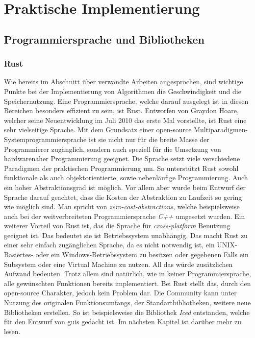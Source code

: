 \section{Praktische Implementierung}

\subsection{Programmiersprache und Bibliotheken}
\subsubsection{Rust}
    Wie bereits im Abschnitt über verwandte Arbeiten angesprochen, sind wichtige Punkte bei der Implementierung von Algorithmen die 
    Geschwindigkeit und die Speichernutzung. Eine Programmiersprache, welche darauf ausgelegt ist in diesen Bereichen besonders effizient zu sein, 
    ist Rust. \cite{rust} Entworfen von Graydon Hoare, welcher seine Neuentwicklung im Juli 2010 das erste Mal  vorstellte, ist Rust eine sehr vielseitige Sprache.
    Mit dem Grundsatz einer open-source Multiparadigmen-Systemprogrammiersprache ist sie nicht nur für die breite Masse der Programmierer zugänglich, sondern auch 
    speziell für die Umsetzung von hardwarenaher Programmierung geeignet. Die Sprache setzt viele verschiedene Paradigmen der praktischen Programmierung um. So 
    unterstützt Rust sowohl funktionale als auch objektorientierte, sowie nebenläufige Programmierung. Auch ein hoher Abstraktionsgrad ist möglich. Vor allem aber 
    wurde beim Entwurf der Sprache darauf geachtet, dass die Kosten der Abstraktion zu Laufzeit so gering wie möglich sind. Man spricht von \emph{zero-cost-abstractions}, 
    welche beispielsweise auch bei der weitverbreiteten Programmiersprache \emph{C++} umgesetzt wurden. \cite{rust-wiki}
    Ein weiterer Vorteil von Rust ist, das die Sprache für \emph{cross-platform} Benutzung geeignet ist. Das bedeutet sie ist Betriebssystem unabhängig. Das macht Rust zu einer 
    sehr einfach zugänglichen Sprache, da es nicht notwendig ist, ein UNIX-Basiertes- oder ein Windows-Betriebssystem zu besitzen oder gegebenen Falls ein Subsystem oder eine 
    Virtual Machine zu nutzen. All das würde zusätzlichen Aufwand bedeuten.
    Trotz allem sind natürlich, wie in keiner Programmiersprache, alle gewünschten Funktionen bereits implementiert. Bei Rust stellt das, durch den open-source Charakter,
    jedoch kein Problem dar. Die Community kann unter Nutzung des originalen Funktionsumfangs, der Standartbibliotheken, weitere neue Bibliotheken erstellen. 
    So ist beispielsweise die Bibliothek \emph{Iced} entstanden, welche für den Entwurf von \ac{gui}s gedacht ist. Im nächsten Kapitel ist darüber mehr zu lesen.
